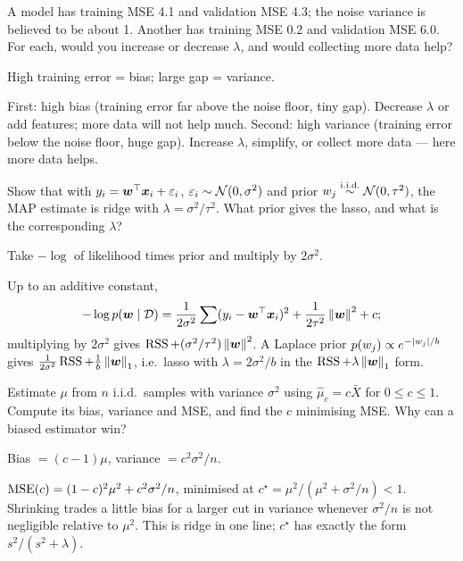 \begin{problem}
	\onechili
	A model has training MSE 4.1 and validation MSE 4.3; the noise variance is believed to be
	about 1. Another has training MSE 0.2 and validation MSE 6.0. For each, would you increase or
	decrease $\lambda$, and would collecting more data help?
	\begin{hint}
		High training error = bias; large gap = variance.
	\end{hint}
	\begin{sol}
		First: high bias (training error far above the noise floor, tiny gap). Decrease $\lambda$ or
		add features; more data will not help much. Second: high variance (training error below the
		noise floor, huge gap). Increase $\lambda$, simplify, or collect more data --- here more data
		helps.
	\end{sol}
\end{problem}

\begin{problem}
	\twochili
	Show that with $y_i={\bm{w}}^{\top}{\bm{x}}_i+\varepsilon_i$, $\varepsilon_i\sim\mathcal{N}(0,\sigma^2)$ and prior
	$w_j\overset{\text{i.i.d.}}{\sim}\mathcal{N}(0,\tau^2)$, the MAP estimate is ridge with $\lambda=\sigma^2/\tau^2$. What prior
	gives the lasso, and what is the corresponding $\lambda$?
	\begin{hint}
		Take $-\log$ of likelihood times prior and multiply by $2\sigma^2$.
	\end{hint}
	\begin{sol}
		Up to an additive constant,
		\[ -\log p({\bm{w}}\mid\mathcal{D})=\frac{1}{2\sigma^2}\sum(y_i-{\bm{w}}^{\top}{\bm{x}}_i)^2+\frac{1}{2\tau^2}\left\lVert {\bm{w}} \right\rVert^2+c; \]
		multiplying by $2\sigma^2$ gives $\operatorname{RSS}+(\sigma^2/\tau^2)\left\lVert {\bm{w}} \right\rVert^2$. A Laplace prior
		$p(w_j)\propto e^{-\left\lvert w_j \right\rvert/b}$ gives $\frac{1}{2\sigma^2}\operatorname{RSS}+\frac1b\left\lVert {\bm{w}} \right\rVert_1$, i.e.\
		lasso with $\lambda=2\sigma^2/b$ in the $\operatorname{RSS}+\lambda\left\lVert {\bm{w}} \right\rVert_1$ form.
	\end{sol}
\end{problem}

\begin{problem}
	\twochili
	Estimate $\mu$ from $n$ i.i.d.\ samples with variance $\sigma^2$ using $\hat\mu_c=c\bar X$ for
	$0\le c\le1$. Compute its bias, variance and MSE, and find the $c$ minimising MSE. Why can a
	biased estimator win?
	\begin{hint}
		Bias $=(c-1)\mu$, variance $=c^2\sigma^2/n$.
	\end{hint}
	\begin{sol}
		$\operatorname{MSE}(c)=(1-c)^2\mu^2+c^2\sigma^2/n$, minimised at $c^\star=\mu^2/(\mu^2+\sigma^2/n)<1$.
		Shrinking trades a little bias for a larger cut in variance whenever $\sigma^2/n$ is not
		negligible relative to $\mu^2$. This is ridge in one line; $c^\star$ has exactly the form
		$s^2/(s^2+\lambda)$.
	\end{sol}
\end{problem}

